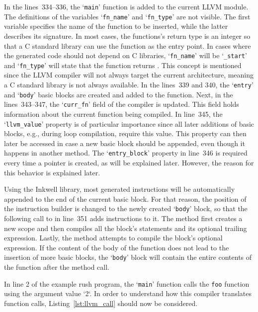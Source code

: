 In the lines~334--336, the `\texttt{main}' function is added to the current LLVM module.
The definitions of the variables `\texttt{fn\_name}' and `\texttt{fn\_type}' are not visible.
The first variable specifies the name of the function to be inserted, while the latter describes its signature.
In most cases, the  functions's return type is an integer so that a C standard library can use the function as the entry point.
In cases where the generated code should not depend on C libraries, `\Verb|fn_name|' will be `\Verb|_start|' and `\Verb|fn_type|' will state that the function returns .
This concept is mentioned since the LLVM compiler will not always target the current architecture,
meaning a C standard library is not always available.
In the lines~339 and 340, the `\texttt{entry}' and `\texttt{body}' basic blocks are created and added to the function.
Next, in the lines~343--347, the `\Verb|curr_fn|' field of the compiler is updated.
This field holds information about the current function being compiled.
In line~345, the `\Verb|llvm_value|' property is of particular importance since all later additions of basic blocks, e.g., during loop compilation, require this value.
This property can then later be accessed in case a new basic block should be appended, even though it happens in another method.
The `\Verb|entry_block|' property in line~346 is required every time a pointer is created, as will be explained later.
However, the reason for this behavior is explained later.

Using the Inkwell library, most generated instructions will be automatically appended to the end of the current basic block.
For that reason, the position of the instruction builder is changed to the newly created `\texttt{body}' block,
so that the following call to  in line~351 adds instructions to it.
The  method first creates a new scope and then compiles all the block's statements and its optional trailing expression.
Lastly, the method attempts to compile the block's optional expression.
If the content of the body of the  function does not lead to the insertion of more basic blocks,
the `\texttt{body}' block will contain the entire contents of the function after the method call.

In line 2 of the example rush program, the `\texttt{main}' function calls the \texttt{foo} function using the argument value `2`.
In order to understand how this compiler translates function calls, Listing~\ref{lst:llvm_call} should now be considered.

